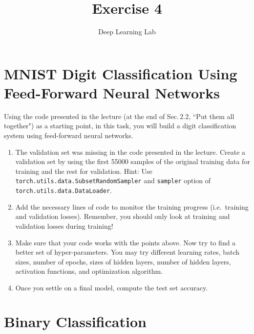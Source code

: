 \documentclass[a4paper,11pt]{article}
\title{Exercise 4}
\author{Deep Learning Lab}
\begin{document}
\maketitle

\section{MNIST Digit Classification Using Feed-Forward Neural Networks}
Using the code presented in the lecture (at the end of Sec.\,2.2, ``Put them all together") as a starting point, in this task, you will build a digit classification system using feed-forward neural networks.
\begin{enumerate}
\item The validation set was missing in the code presented in the lecture.
Create a validation set by using the first 55000 samples of the original training data for training and the rest for validation.
Hint: Use \texttt{torch.utils.data.SubsetRandomSampler} and \texttt{sampler} option of \texttt{torch.utils.data.DataLoader}.
 \item Add the necessary lines of code to monitor the training progress (i.e.~training and validation losses).
Remember, you should only look at training and validation losses during training!
\item Make sure that your code works with the points above.
Now try to find a better set of hyper-parameters.
You may try different learning rates, batch sizes, number of epochs,
sizes of hidden layers, number of hidden layers,
activation functions,
and optimization algorithm. 
\item Once you settle on a final model, compute the test set accuracy.
\end{enumerate}

\section{Binary Classification}
\end{document}
